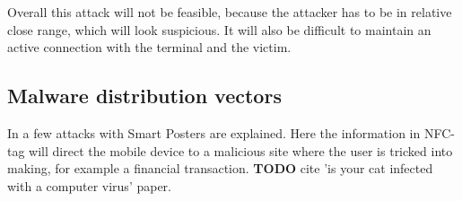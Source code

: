 Overall this attack will not be feasible, because the attacker has to be in relative close range, which will look suspicious. It will also be difficult to maintain an active connection with the terminal and the victim.




\subsection{Malware distribution vectors}
In \cite{10.1109/ARES.2009.46} a few attacks with Smart Posters are explained.
Here the information in NFC-tag will direct the mobile device to a malicious site where the user is tricked into making, for example a financial transaction.
\textbf{TODO} cite 'is your cat infected with a computer virus' paper.






